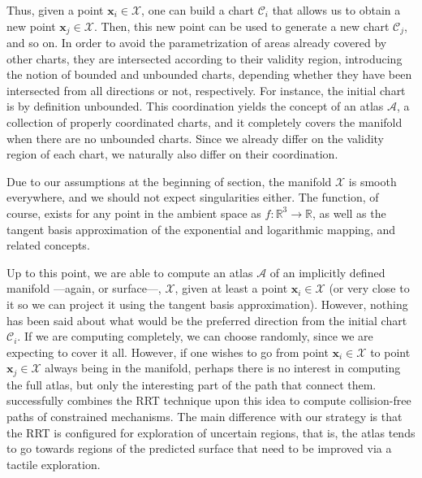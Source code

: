 Thus, given a point $\mathbf{x}_i \in \mathcal{X}$, one can build a chart $\mathcal{C}_i$ that allows us to obtain a new point $\mathbf{x}_j \in \mathcal{X}$. Then, this new point can be used to generate a new chart $\mathcal{C}_j$, and so on. In order to avoid the parametrization of areas already covered by other charts, they are intersected according to their validity region, introducing the notion of bounded and unbounded charts, depending whether they have been intersected from all directions or not, respectively. For instance, the initial chart is by definition unbounded. This coordination yields the concept of an atlas $\mathcal{A}$, a collection of properly coordinated charts, and it completely covers the manifold when there are no unbounded charts. Since we already differ on the validity region of each chart, we naturally also differ on their coordination.

Due to our assumptions at the beginning of section, the manifold $\mathcal{X}$ is smooth everywhere, and we should not expect singularities either. The function, of course, exists for any point in the ambient space as $f:\mathbb{R}^3 \rightarrow \mathbb{R}$, as well as the tangent basis approximation of the exponential and logarithmic mapping, and related concepts. 

Up to this point, we are able to compute an atlas $\mathcal{A}$ of an implicitly defined manifold ---again, or surface---, $\mathcal{X}$, given at least a point $\mathbf{x}_i \in \mathcal{X}$ (or very close to it so we can project it using the tangent basis approximation). However, nothing has been said about what would be the preferred direction from the initial chart $\mathcal{C}_i$. If we are computing completely, we can choose randomly, since we are expecting to cover it all. However, if one wishes to go from point $\mathbf{x}_i \in \mathcal{X}$ to point $\mathbf{x}_j \in \mathcal{X}$ always being in the manifold, perhaps there is no interest in computing the full atlas, but only the interesting part of the path that connect them. \citet{Jaillet2013Path} successfully combines the RRT technique upon this idea to compute collision-free paths of constrained mechanisms. The main difference with our strategy is that the RRT is configured for exploration of uncertain regions, that is, the atlas tends to go towards regions of the predicted surface that need to be improved via a tactile exploration.


